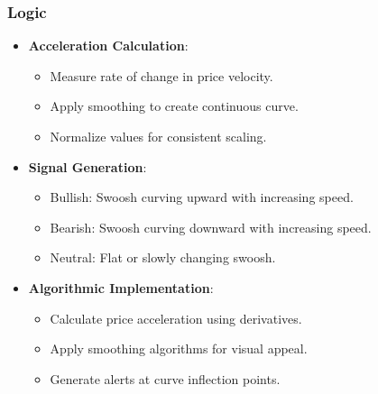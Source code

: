 \documentclass[12pt]{article}
\begin{document}
\subsubsection{Logic}
\begin{itemize}
\item \textbf{Acceleration Calculation}:
  \begin{itemize}
  \item Measure rate of change in price velocity.
  \item Apply smoothing to create continuous curve.
  \item Normalize values for consistent scaling.
  \end{itemize}
\item \textbf{Signal Generation}:
  \begin{itemize}
  \item Bullish: Swoosh curving upward with increasing speed.
  \item Bearish: Swoosh curving downward with increasing speed.
  \item Neutral: Flat or slowly changing swoosh.
  \end{itemize}
\item \textbf{Algorithmic Implementation}:
  \begin{itemize}
  \item Calculate price acceleration using derivatives.
  \item Apply smoothing algorithms for visual appeal.
  \item Generate alerts at curve inflection points.
  \end{itemize}
\end{itemize}
\end{document}
